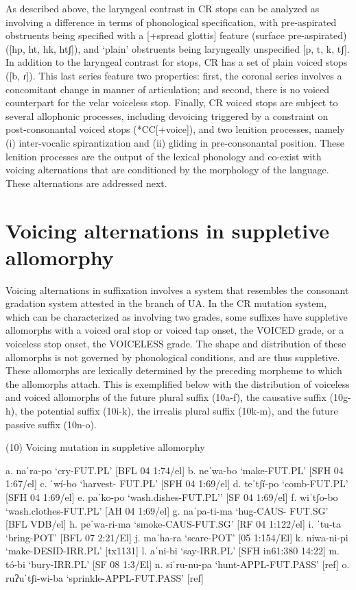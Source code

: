 As described above, the laryngeal contrast in CR stops can be analyzed as involving a difference in terms of phonological specification, with pre-aspirated obstruents being specified with a [+spread glottis] feature (surface pre-aspirated) ([hp, ht, hk, htʃ]), and ‘plain’ obstruents being laryngeally unspecified [p, t, k, tʃ]. In addition to the laryngeal contrast for stops, CR has a set of plain voiced stops ([b, ɾ]). This last series feature two properties: first, the coronal series involves a concomitant change in manner of articulation; and second, there is no voiced counterpart for the velar voiceless stop. Finally, CR voiced stops are subject to several allophonic processes, including devoicing triggered by a constraint on post-consonantal voiced stops (*CC[+voice]), and two lenition processes, namely (i) inter-vocalic spirantization and (ii) gliding in pre-consonantal position. These lenition processes are the output of the lexical phonology and co-exist with voicing alternations that are conditioned by the morphology of the language. These alternations are addressed next.


\section{Voicing alternations in suppletive allomorphy}
\label{sec: voicing alternations in suppletive allomorphy}

Voicing alternations in suffixation involves a system that resembles the consonant gradation system attested in the  branch of UA. In the CR mutation system, which can be characterized as involving two grades, some suffixes have suppletive allomorphs with a voiced oral stop or voiced tap onset, the VOICED grade, or a voiceless stop onset, the VOICELESS grade. The shape and distribution of these allomorphs is not governed by phonological conditions, and are thus suppletive. These allomorphs are lexically determined by the preceding morpheme to which the allomorphs attach. This is exemplified below with the distribution of voiceless and voiced allomorphs of the future plural suffix (10a-f), the causative suffix (10g-h), the potential suffix (10i-k), the irrealis plural suffix (10k-m), and the future passive suffix (10n-o).

(10)	Voicing mutation in suppletive allomorphy

a.	naˈra-po		‘cry-FUT.PL’						[BFL 04 1:74/el]
b.	neˈwa-bo		‘make-FUT.PL’						[SFH 04 1:67/el]
c.	ˈwí-bo 		‘harvest- FUT.PL’					[SFH 04 1:69/el]
d.	teˈtʃí-po		‘comb-FUT.PL’						[SFH 04 1:69/el]
e.	paˈko-po		‘wash.dishes-FUT.PL’’					[SF 04 1:69/el]
f.	wiˈtʃo-bo		‘wash.clothes-FUT.PL’					[AH 04 1:69/el]
g.	naˈpa-ti-ma  	‘hug-CAUS- FUT.SG’					[BFL VDB/el]
h.	peˈwa-ri-ma	‘smoke-CAUS-FUT.SG’   					[RF 04 1:122/el]
i.	ˈtu-ta		‘bring-POT’						[BFL 07 2:21/El]
j.	maˈha-ra		‘scare-POT’						[05 1:154/El]
k.	niwa-ni-pi 		‘make-DESID-IRR.PL’					[tx1131]
l.	aˈni-bi		‘say-IRR.PL’						[SFH in61:380 14:22]
m.	tó-bi 		‘bury-IRR.PL’ 						[SF 08 1:3/El]
n.	siˈru-nu-pa  	‘hunt-APPL-FUT.PASS’					[ref]
o.	ruʔuˈtʃi-wi-ba 	‘sprinkle-APPL-FUT.PASS’ 				[ref]

